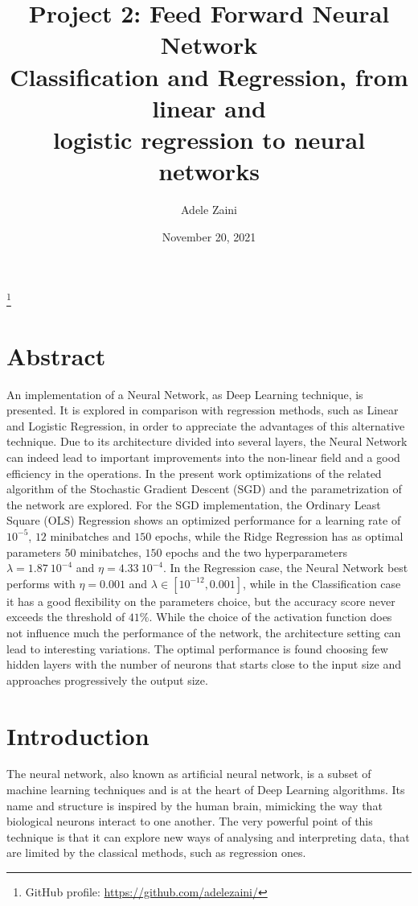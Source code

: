 \documentclass[english,notitlepage,reprint,nofootinbib]{revtex4-1}  %
\begin{document}
\title{\LARGE{Project 2: Feed Forward Neural Network}\\
  \large Classification and Regression, from linear and \\ logistic regression to neural networks}
\author{Adele Zaini}
\thanks{GitHub profile: \href{https://github.com/adelezaini/}{ https://github.com/adelezaini/}}
\date{November 20, 2021}                             %
\noaffiliation                            %

\maketitle
\section{Abstract}

An implementation of a Neural Network, as Deep Learning technique, is presented. It is explored in comparison with regression methods, such as Linear and Logistic Regression, in order to appreciate the advantages of this alternative technique. Due to its architecture divided into several layers, the Neural Network can indeed lead to important improvements into the non-linear field and a good efficiency in the operations. In the present work optimizations of the related algorithm of the Stochastic Gradient Descent (SGD) and the parametrization of the network are explored. For the SGD implementation, the Ordinary Least Square (OLS) Regression shows an optimized performance for a learning rate of $10^{-5}$, $12$ minibatches and $150$ epochs, while the Ridge Regression has as optimal parameters $50$ minibatches, $150$ epochs and the two hyperparameters $\lambda = 1.87\ 10^{-4}$ and $\eta = 4.33 \ 10^{-4}$. In the Regression case, the Neural Network best performs with $\eta=0.001$ and $\lambda \in [10^{-12},0.001]$, while in the Classification case it has a good flexibility on the parameters choice, but the accuracy score never exceeds the threshold of $41\%$. While the choice of the activation function does not influence much the performance of the network, the architecture setting can lead to interesting variations. The optimal performance is found choosing few hidden layers with the number of neurons that starts close to the input size and approaches progressively the output size. 

\section{Introduction}
The neural network, also known as artificial neural network, is a subset of machine learning techniques and is at the heart of Deep Learning algorithms. Its name and structure is inspired by the human brain, mimicking the way that biological neurons interact to one another. The very powerful point of this technique is that it can explore new ways of analysing and interpreting data, that are limited by the classical methods, such as regression ones. 
\end{document}

